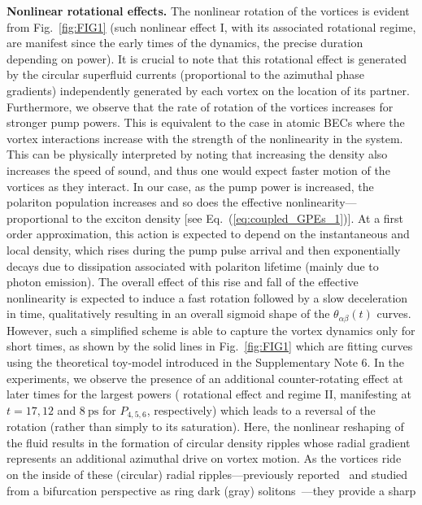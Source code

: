 \documentclass[aps,prb,twocolumn,superscriptaddress,nofootinbib]{revtex4}
\def\editr#1{#1}
\def\refer#1{#1}
\def\edstrike#1{}
\begin{document}
\noindent \editr{\textbf{Nonlinear rotational effects.}}
The nonlinear rotation of the vortices is evident from
Fig.~\ref{fig:FIG1} (such \edstrike{driving action} \editr{nonlinear effect I, with its associated rotational regime, are} manifest since the early times of the dynamics,
the precise duration depending on power).
%
It is crucial to note that this rotational effect is generated
by the circular superfluid currents (proportional to the \editr{azimuthal phase gradients})
independently generated by each vortex on the location of its partner.
Furthermore, we observe that the rate of rotation of the vortices
increases for stronger pump powers. This is \editr{equivalent} to 
the case in atomic BECs where the vortex interactions
increase with the strength of the nonlinearity in the system.
%
\refer{This can be physically interpreted by noting that 
increasing the density also increases the speed 
of sound, and thus one would expect faster 
motion of the vortices as they interact.}
%
In our case, as the pump power is increased, the polariton population increases
and\edstrike{, thus,} \editr{so does} the effective nonlinearity---proportional to the exciton
density [see Eq.~(\ref{eq:coupled_GPEs_1})].
%
At a first order approximation, this action is expected to depend on the instantaneous
and local density, which rises during
the pump pulse arrival and then exponentially decays due to
dissipation associated with polariton lifetime (mainly due to photon emission).
%
The overall effect of this rise and fall of the effective nonlinearity is expected
to induce a fast rotation followed by a slow deceleration in time,
qualitatively resulting in an overall sigmoid shape of the $\theta_{\alpha\beta}(t)$ curves.
%
However, such a simplified scheme is able to capture the vortex dynamics
only for short times,
as shown by the solid lines in Fig.~\ref{fig:FIG1} which are fitting
curves using the theoretical toy-model
introduced in \editr{the Supplementary Note 6}.
In the experiments, we observe
the presence of an additional counter-rotating effect at later times for the largest powers
(\edstrike{driving action} \editr{rotational effect and regime II}, manifesting at $t = 17, 12$ and $8~\text{ps}$ for $P_{4,5,6}$, respectively)
which leads to a reversal of the rotation (rather than simply to its saturation).
Here, the nonlinear reshaping of the fluid results in the formation of circular density ripples
whose radial gradient represents an additional azimuthal drive on vortex motion.
%
As the vortices ride on the \editr{inside} of 
these (circular) radial ripples\editr{---previously reported~\cite{Liew2007,dominici_real-space_2015,dominici_vortex_2015}
and studied from a bifurcation
perspective as ring dark (gray) solitons~\cite{Rodrigues2014}}---they provide a sharp
\end{document}
